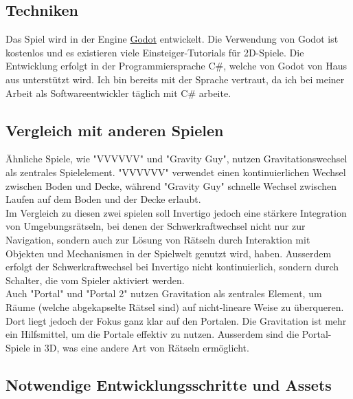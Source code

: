\documentclass{article}
\begin{document}
\subsection{Techniken}

Das Spiel wird in der Engine \href{https://godotengine.org/}{Godot} entwickelt. Die Verwendung von Godot ist kostenlos und es existieren viele Einsteiger-Tutorials für 2D-Spiele.
Die Entwicklung erfolgt in der Programmiersprache C\#, welche von Godot von Haus aus unterstützt wird. Ich bin bereits mit der Sprache vertraut, da ich bei meiner 
Arbeit als Softwareentwickler täglich mit C\# arbeite.

\subsection{Vergleich mit anderen Spielen}

Ähnliche Spiele, wie "VVVVVV" und "Gravity Guy", nutzen Gravitationswechsel als zentrales Spielelement.
"VVVVVV" verwendet einen kontinuierlichen Wechsel zwischen Boden und Decke, während "Gravity Guy" schnelle Wechsel zwischen Laufen auf dem Boden und der Decke erlaubt.
\\
Im Vergleich zu diesen zwei spielen soll Invertigo jedoch eine stärkere Integration von Umgebungsrätseln, bei denen der Schwerkraftwechsel nicht nur zur Navigation,
sondern auch zur Lösung von Rätseln durch Interaktion mit Objekten und Mechanismen in der Spielwelt genutzt wird, haben.
Ausserdem erfolgt der Schwerkraftwechsel bei Invertigo nicht kontinuierlich, sondern durch Schalter, die vom Spieler aktiviert werden.
\\
Auch "Portal" und "Portal 2" nutzen Gravitation als zentrales Element, um Räume (welche abgekapselte Rätsel sind) auf nicht-lineare Weise zu überqueren.
Dort liegt jedoch der Fokus ganz klar auf den Portalen. Die Gravitation ist mehr ein Hilfsmittel, um die Portale effektiv zu nutzen.
Ausserdem sind die Portal-Spiele in 3D, was eine andere Art von Rätseln ermöglicht.

\subsection{Notwendige Entwicklungsschritte und Assets}
\end{document}
